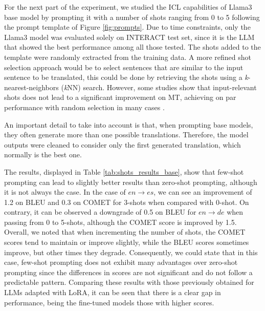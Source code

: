 \documentclass[11pt,english,listoffigures,listoftables]{tfgetsinf}
\begin{document}
For the next part of the experiment, we studied the ICL capabilities of Llama3 base model by prompting it with a number of shots ranging from 0 to 5 following the prompt template of Figure \ref{fig:prompts}. Due to time constraints, only the Llama3 model was evaluated solely on INTERACT test set, since it is the LLM that showed the best performance among all those tested. The shots added to the template were randomly extracted from the training data. A more refined shot selection approach would be to select sentences that are similar to the input sentence to be translated, this could be done by retrieving the shots using a \textit{k}-nearest-neighbors (\textit{k}NN) search. However, some studies show that input-relevant shots does not lead to a significant improvement on MT, achieving on par performance with random selection in many cases \cite{vilar2022prompting}.

An important detail to take into account is that, when prompting base models, they often generate more than one possible translations. Therefore, the model outputs were cleaned to consider only the first generated translation, which normally is the best one. 

The results, displayed in Table \ref{tab:shots_results_base}, show that few-shot prompting can lead to slightly better results than zero-shot prompting, although it is not always the case. In the case of $en \rightarrow es$, we can see an improvement of 1.2 on BLEU and 0.3 on COMET for 3-shots when compared with 0-shot. On contrary, it can be observed a downgrade of 0.5 on BLEU for $en \rightarrow de $ when passing from 0 to 5-shots, although the COMET score is improved by 1.5. Overall, we noted that when incrementing the number of shots, the COMET scores tend to maintain or improve slightly, while the BLEU scores sometimes improve, but other times they degrade. Consequently, we could state that in this case, few-shot prompting does not exhibit many advantages over zero-shot prompting since the differences in scores are not significant and do not follow a predictable pattern. Comparing these results with those previously obtained for LLMs adapted with LoRA, it can be seen that there is a clear gap in performance, being the fine-tuned models those with higher scores. 
\end{document}
